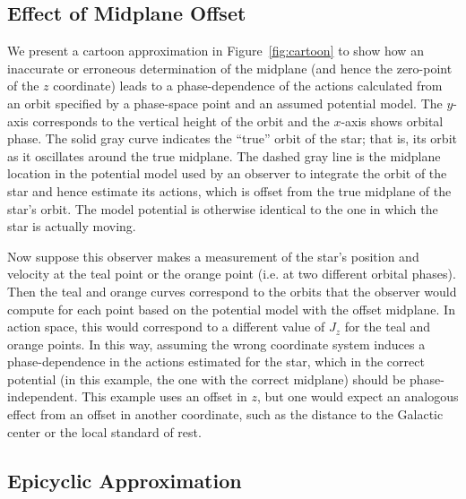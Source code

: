 \documentclass[twocolumn]{aastex62}
\begin{document}
\subsection{Effect of Midplane Offset} \label{ssec:cartoon}
We present a cartoon approximation in Figure~\ref{fig:cartoon} to show how an
inaccurate or erroneous determination of the midplane (and hence the
zero-point of the $z$ coordinate) leads to a phase-dependence of the actions
calculated from an orbit specified by a phase-space point and an assumed
potential model. The $y$-axis corresponds to the vertical height of the orbit
and the $x$-axis shows orbital phase. The solid gray curve indicates the
``true'' orbit of the star; that is, its orbit as it oscillates around the
true midplane. The dashed gray line is the midplane location in the potential
model used by an observer to integrate the orbit of the star and hence
estimate its actions, which is offset from the true midplane of the star's
orbit. The model potential is otherwise identical to the one in which the star
is actually moving.

Now suppose this observer makes a measurement of the star's position and
velocity at the teal point or the orange point (i.e. at two different orbital
phases). Then the teal and orange curves correspond to the orbits that the
observer would compute for each point based on the potential model with the
offset midplane. In action space, this would correspond to a different value
of $J_z$ for the teal and orange points. In this way, assuming the wrong
coordinate system induces a phase-dependence in the actions estimated for the
star, which in the correct potential (in this example, the one with the
correct midplane) should be phase-independent. This example uses an offset in $z$, but one would expect an analogous effect from an offset in another coordinate, such as the distance to the Galactic center or the local standard of rest.

\subsection{Epicyclic Approximation} \label{ssec:epi_action}
\end{document}
